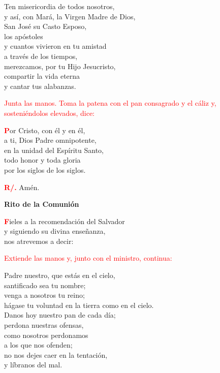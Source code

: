 \documentclass[12pt, letterpaper]{report}
\begin{document}
\noindent
Ten misericordia de todos nosotros,\\
y as\'i, con Mar\'a, la Virgen Madre de Dios,\\
San Jos\'e su Casto Esposo, \\
los ap\'ostoles\\
y cuantos vivieron en tu amistad\\
a trav\'es de los tiempos,\\
merezcamos, por tu Hijo Jesucristo,\\
compartir la vida eterna\\
y cantar tus alabanzas. 

\large{\textcolor{red}{Junta las manos. Toma la patena con el pan consagrado y el c\'aliz y, sosteni\'endolos elevados, dice:}}

\lettrine[lines=1]{\bfseries \textcolor{red}{P}}{}\Large or Cristo, con \'el y en \'el,\\
a ti, Dios Padre omnipotente,\\
en la unidad del Esp\'iritu Santo,\\
todo honor y toda gloria\\
por los siglos de los siglos.

\Large \hspace{-0.9cm} {\bfseries \textcolor{red}{R/.}} \hspace{0.5cm} Am\'en.

\newpage

\begin{center}
\Huge {\bfseries Rito de la Comuni\'on}
\end{center}

\lettrine[lines=1]{\bfseries \textcolor{red}{F}}{}\Large ieles a la recomendaci\'on del Salvador\\
y siguiendo su divina ense\~nanza,\\
nos atrevemos a decir:

\large{\textcolor{red}{Extiende las manos y, junto con el ministro, continua:}}

\noindent
\Large Padre nuestro, que est\'as en el cielo,\\
santificado sea tu nombre;\\
venga a nosotros tu reino;\\
h\'agase tu voluntad en la tierra como en el cielo.\\
Danos hoy nuestro pan de cada d\'ia;\\
perdona nuestras ofensas,\\
como nosotros perdonamos\\
a los que nos ofenden;\\
no nos dejes caer en la tentaci\'on,\\
y l\'ibranos del mal.
\end{document}
